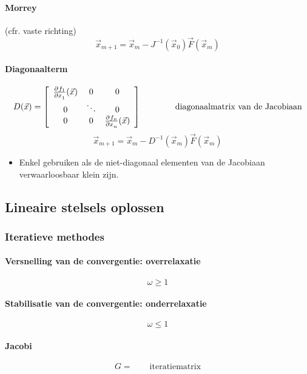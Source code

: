 \paragraph{Morrey} (cfr. vaste richting)
\[
 \vec{x}_{m+1} = \vec{x}_m - J^{-1}(\vec{x}_0) \vec{F}(\vec{x}_m)
\]

\paragraph{Diagonaalterm}
\[
  D(\vec{x}) =
  \left[
  \begin{array}{ccc}
    \frac{\partial ^{}{f_1}}{\partial x_1^{}} (\vec{x}) & 0 & 0\\
    0 & \ddots & 0\\
    0 & 0 & \frac{\partial ^{}{f_n}}{\partial x_n^{}} (\vec{x})\\
  \end{array}
  \right]
  \qquad \qquad
  \mbox{diagonaalmatrix van de Jacobiaan}
\]
\[
 \vec{x}_{m+1} = \vec{x}_m - D^{-1}(\vec{x}_m) \vec{F}(\vec{x}_m)
\]
\begin{itemize}
  \item[\con] Enkel gebruiken als de niet-diagonaal elementen van de Jacobiaan verwaarloosbaar klein zijn.
\end{itemize}


\subsection{Lineaire stelsels oplossen}
\label{sec:NALinStelsels}

\subsubsection{Iteratieve methodes}
\label{sec:NALinSIteratief}

\paragraph{Versnelling van de convergentie: overrelaxatie}
\[
  \omega \geq 1
\]

\paragraph{Stabilisatie van de convergentie: onderrelaxatie}
\[
  \omega \leq 1
\]

\paragraph{Jacobi}
\[
  G =
  \qquad \mbox{iteratiematrix}
\]


